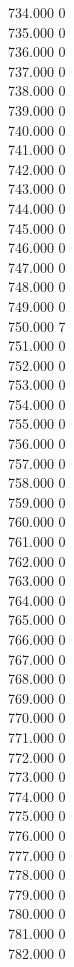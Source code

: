 { 734.000	0 \\
 735.000	0 \\
 736.000	0 \\
 737.000	0 \\
 738.000	0 \\
 739.000	0 \\
 740.000	0 \\
 741.000	0 \\
 742.000	0 \\
 743.000	0 \\
 744.000	0 \\
 745.000	0 \\
 746.000	0 \\
 747.000	0 \\
 748.000	0 \\
 749.000	0 \\
 750.000	7 \\
 751.000	0 \\
 752.000	0 \\
 753.000	0 \\
 754.000	0 \\
 755.000	0 \\
 756.000	0 \\
 757.000	0 \\
 758.000	0 \\
 759.000	0 \\
 760.000	0 \\
 761.000	0 \\
 762.000	0 \\
 763.000	0 \\
 764.000	0 \\
 765.000	0 \\
 766.000	0 \\
 767.000	0 \\
 768.000	0 \\
 769.000	0 \\
 770.000	0 \\
 771.000	0 \\
 772.000	0 \\
 773.000	0 \\
 774.000	0 \\
 775.000	0 \\
 776.000	0 \\
 777.000	0 \\
 778.000	0 \\
 779.000	0 \\
 780.000	0 \\
 781.000	0 \\
 782.000	0 \\
}
